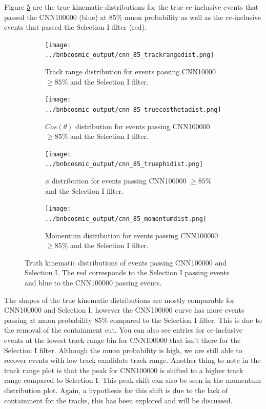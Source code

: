 Figure \ref{fig:truthkinematics} are the true kinematic distributions for the true cc-inclusive events that passed the CNN100000 (blue) at 85\% muon probability as well as the cc-inclusive events that passed the Selection I filter (red).  

\begin{figure}[htp!]
\centering
	\begin{subfigure}[b]{.475\textwidth}
	\centering
		\texttt{[image: ../bnbcosmic\_output/cnn\_85\_trackrangedist.png]}
		\caption{Track range distribution for events passing CNN10000 $\geq 85\%$ and the Selection I filter.} 
		\label{fig:cnn85trackrange}
	\end{subfigure}
	\quad
	\begin{subfigure}[b]{.475\textwidth}
	\centering
		\texttt{[image: ../bnbcosmic\_output/cnn\_85\_truecosthetadist.png]}
		\caption{$Cos(\theta)$ distribution for events passing CNN100000 $\geq 85\%$ and the Selection I filter.} 
		\label{fig:cnn85costheta}
	\end{subfigure}
	\quad
	\begin{subfigure}[b]{.475\textwidth}
	\centering
		\texttt{[image: ../bnbcosmic\_output/cnn\_85\_truephidist.png]}
		\caption{$\phi$ distribution for events passing CNN100000 $\geq 85\%$ and the Selection I filter.} 
		\label{fig:cnn85phi}
	\end{subfigure}
	\quad
	\begin{subfigure}[b]{.475\textwidth}
	\centering
		\texttt{[image: ../bnbcosmic\_output/cnn\_85\_momentumdist.png]}
		\caption{Momentum distribution for events passing CNN100000 $\geq 85 \%$ and the Selection I filter.} 
		\label{fig:cnn85momentum}
	\end{subfigure}
\caption{Truth kinematic distributions of events passing CNN100000 and Selection I. The red corresponds to the Selection I passing events and blue to the CNN100000 passing events.}
\label{fig:truthkinematics}
\end{figure}

The shapes of the true kinematic distributions are mostly comparable for CNN100000 and Selection I, however the CNN100000 curve has more events passing at muon probability 85\% compared to the Selection I filter. This is due to the removal of the containment cut. You can also see entries for cc-inclusive events at the lowest track range bin for CNN100000 that isn't there for the Selection I filter. Although the muon probability is high, we are still able to recover events with low track candidate track range. Another thing to note in the track range plot is that the peak for CNN100000 is shifted to a higher track range compared to Selection I. This peak shift can also be seen in the momentum distribution plot. Again, a hypothesis for this shift is due to the lack of containment for the tracks, this has been explored and will be discussed. 

